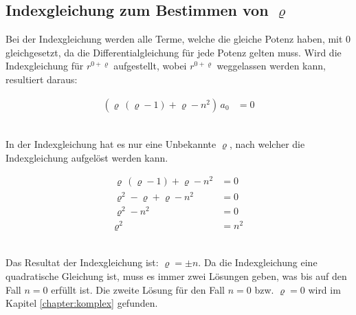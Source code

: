 \subsection[Indexgleichung f\"ur $\varrho$]{Indexgleichung zum Bestimmen von $\varrho$}
\begin{normalsize}
	Bei der Indexgleichung werden alle Terme,
	welche die gleiche Potenz haben,
	mit $0$ gleichgesetzt,
	da die Differentialgleichung f\"ur jede Potenz gelten muss.
	Wird die Indexgleichung f\"ur $r^{0 + \varrho}$ aufgestellt,
	wobei $r^{0 + \varrho}$ weggelassen werden kann, resultiert daraus:
\end{normalsize}
\begin{align}
	\left( \varrho \, \left( \varrho -1 \right) + \varrho - n^2 \right) \, a_0 &= 0
	\label{eq:bessel:indexgleichung:ausgangslage}
\end{align}
\\
\begin{normalsize}
	In der Indexgleichung  hat es nur eine Unbekannte $\varrho$,
	nach welcher die Indexgleichung aufgel\"ost werden kann.
\end{normalsize}
\begin{align*}
	\varrho \, \left( \varrho -1 \right) + \varrho - n^2 &= 0 \\
	\varrho ^2 - \varrho + \varrho -n^2 &= 0  \\
	\varrho ^2 - n^2 &= 0 \\
	\varrho ^2 &= n^2
\end{align*}
\\
\begin{normalsize}
	Das Resultat der Indexgleichung ist: $\varrho = \pm n$.
	Da die Indexgleichung eine quadratische Gleichung ist,
	muss es immer zwei L\"osungen geben,
	was bis auf den Fall $n = 0$ erf\"ullt ist.
	Die zweite L\"osung f\"ur den Fall $n = 0$ \acs{bzw.} $\varrho = 0$ wird im Kapitel \ref{chapter:komplex} gefunden.
\end{normalsize}


